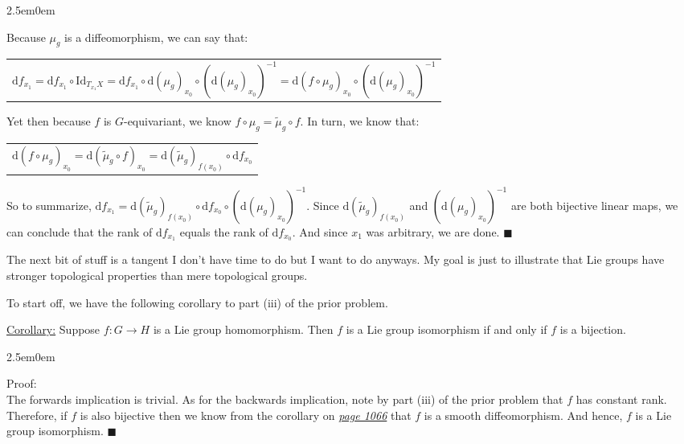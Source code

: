 \documentclass{book}
\newcommand{\inLinkRap}[2]{{\color{blue}\hyperlink{#1}{\textit{#2}}}}
\newcommand{\hTwo}{%
\color{Black}%
   \fontsize{13}{15}\selectfont%
}
\newcommand{\exTwo}{%
   \color{Purple}%
   \fontsize{13}{15}\selectfont%
}
\newcommand{\exThreeP}{%
   \color{RedViolet}%
   \fontsize{12}{14}\selectfont%
}
\newenvironment{myIndent}{%
   \begin{adjustwidth}{2.5em}{0em}%
}{%
   \end{adjustwidth}%
}
\newcommand{\myId}{\mathrm{Id}}
\newcommand{\df}{\mathrm{d}}
\newcommand{\retTwo}{\hfill\bigbreak}
\begin{document}
\begin{itemize}
\begin{myIndent}
		Because $\mu_g$ is a diffeomorphism, we can say that:

		{\centering \begin{tabular}{l}
			$\df f_{x_1} = \df f_{x_1} \circ \myId_{T_{x_1} X}= \df f_{x_1} \circ \df (\mu_g)_{x_0} \circ (\df (\mu_g)_{x_0})^{-1} = \df (f \circ \mu_g)_{x_0} \circ (\df (\mu_g)_{x_0})^{-1}$
		\end{tabular}\retTwo\par}

		Yet then because $f$ is $G$-equivariant, we know $f \circ \mu_g = \widetilde{\mu}_g \circ f$. In turn, we know that:

		{\centering \begin{tabular}{l}
			$\df (f \circ \mu_g)_{x_0} = \df (\widetilde{\mu}_g \circ f)_{x_0} = \df (\widetilde{\mu}_g)_{f(x_0)} \circ \df f_{x_0}$
		\end{tabular}\retTwo\par}

		So to summarize, $\df f_{x_1} = \df (\widetilde{\mu}_g)_{f(x_0)} \circ \df f_{x_0} \circ (\df (\mu_g)_{x_0})^{-1}$. Since $\df (\widetilde{\mu}_g)_{f(x_0)}$ and $(\df (\mu_g)_{x_0})^{-1}$ are both bijective linear maps, we can conclude that the rank of $\df f_{x_1}$ equals the rank of $\df f_{x_0}$. And since $x_1$ was arbitrary, we are done. $\blacksquare$\retTwo
	\end{myIndent}
\end{itemize}

\hTwo The next bit of stuff is a tangent I don't have time to do but I want to do anyways. My goal is just to illustrate that Lie groups have stronger topological properties than mere topological groups.\retTwo

To start off, we have the following corollary to part (iii) of the prior problem.\retTwo

\exTwo\ul{Corollary:} Suppose $f: G \to H$ is a Lie group homomorphism. Then $f$ is a Lie group isomorphism if and only if $f$ is a bijection.
\begin{myIndent}\exThreeP
	Proof:\\
	The forwards implication is trivial. As for the backwards implication, note by part (iii) of the prior problem that $f$ has constant rank. Therefore, if $f$ is also bijective then we know from the corollary on \inLinkRap{page 1066 corollary}{page 1066} that $f$ is a smooth diffeomorphism. And hence, $f$ is a Lie group isomorphism. $\blacksquare$\retTwo
\end{myIndent}
\end{document}
